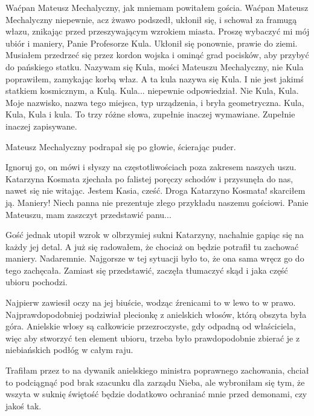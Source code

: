 \divider{}

\begin{dialogue}
\ds{} Waćpan Mateusz Mechalyczny, jak mniemam \dm{} powitałem gościa. \dm{} Waćpan Mateusz Mechalyczny niepewnie, acz żwawo podszedł, ukłonił się, i schował za framugą włazu,
znikając przed przeszywającym wzrokiem miasta.
\ds{} Proszę wybaczyć mi mój ubiór i maniery, Panie Profesorze Kula. \dm{} Ukłonił się ponownie, prawie do ziemi. \dm{}
Musiałem przedrzeć się przez kordon wojska i ominąć grad pocisków, aby przybyć do pańskiego statku.
\ds{} Nazywam się Kula, mości Mateuszu Mechalyczny, nie Kula \dm{} poprawiłem, zamykając korbą właz. \dm{} A ta kula nazywa się Kula. 
I nie jest jakimś statkiem kosmicznym, a Kulą.
\ds{} Kula... \dm{} niepewnie odpowiedział.
\ds{} Nie Kula, Kula. Moje nazwisko, nazwa tego miejsca, typ urządzenia, i bryła geometryczna. Kula, Kula, Kula i kula. To trzy różne słowa, zupełnie inaczej wymawiane.
Zupełnie inaczej zapisywane.
\end{dialogue}

Mateusz Mechalyczny podrapał się po głowie, ścierając puder.

\begin{dialogue}
\ds{} Ignoruj go, on mówi i słyszy na częstotliwościach poza zakresem naszych uszu. \dm{} Katarzyna Kosmata zjechała po falistej poręczy schodów i przysunęła do nas, nawet się nie witając.
\dm{} Jestem Kasia, cześć.
\ds{} Droga Katarzyno Kosmata! \dm{} skarciłem ją. \dm{} Maniery! Niech panna nie prezentuje złego przykładu naszemu gościowi. Panie Mateuszu, mam zaszczyt przedstawić panu...
\end{dialogue}

Gość jednak utopił wzrok w olbrzymiej sukni Katarzyny, nachalnie gapiąc się na każdy jej detal.
A już się radowałem, że chociaż on będzie potrafił tu zachować maniery. Nadaremnie.
Najgorsze w tej sytuacji było to, że ona sama wręcz go do tego zachęcała. 
Zamiast się przedstawić, zaczęła tłumaczyć skąd i jaka część ubioru pochodzi.

Najpierw zawiesił oczy na jej biuście, wodząc źrenicami to w lewo to w prawo.
Najprawdopodobniej podziwiał plecionkę z anielskich włosów, którą obszyta była góra.
Anielskie włosy są całkowicie przezroczyste, gdy odpadną od właściciela, więc
aby stworzyć ten element ubioru, trzeba było prawdopodobnie zbierać je z niebiańskich podłóg w całym raju.
\begin{dialogue}
\ds{} Trafiłam przez to na dywanik anielskiego ministra poprawnego zachowania, chciał to podciągnąć pod brak szacunku dla zarządu Nieba, ale wybroniłam się tym, że wszyta w suknię świętość
będzie dodatkowo ochraniać mnie przed demonami, czy jakoś tak.
\end{dialogue}


